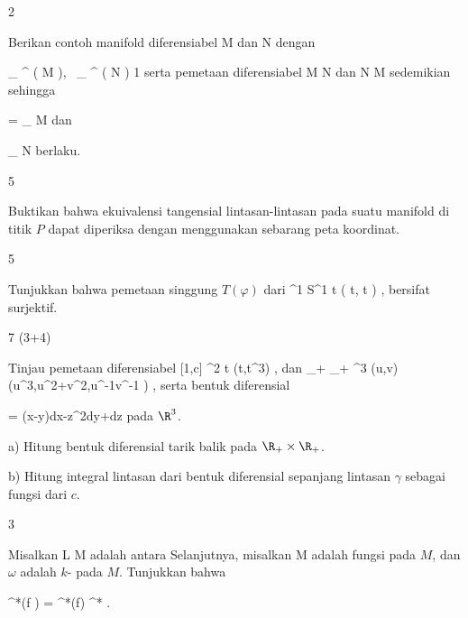 {2}
{

Berikan contoh manifold diferensiabel
\mathkor {} {M} {dan} {N} {}
dengan

\mavergleichskette
{\vergleichskette
{ _{  } ^{  }  \left(   M   \right), \, _{  } ^{  }  \left(   N   \right)
}
{ \geq }{ 1
}
{  }{
}
{    }{
}
{   }{
}
}
{}{}{}
serta pemetaan diferensiabel
\maabb {\varphi} { M } { N
} {}
dan
\maabb {\psi} { N } { M
} {}
sedemikian sehingga

\mavergleichskette
{\vergleichskette
{ \psi \circ \varphi
}
{ = }{
_{ M }
}
{  }{
}
{    }{
}
{   }{
}
}
{}{}{}
dan

\mavergleichskette
{\vergleichskette
{\varphi \circ  \psi
}
{ \neq }{
_{ N }
}
{  }{
}
{    }{
}
{   }{
}
}
{}{}{}
berlaku.

}
{} {}

{5}
{

Buktikan bahwa ekuivalensi tangensial lintasan-lintasan pada suatu manifold di titik $P$ dapat diperiksa dengan menggunakan sebarang peta koordinat.

}
{} {}

{5}
{

Tunjukkan bahwa pemetaan singgung $T(\varphi)$ dari
\maabbeledisp {\varphi} {\R^1} {S^1
} { t } {( \cos  t, \sin  t  )
} {,}
bersifat surjektif.

}
{} {}

{7 (3+4)}
{

Tinjau pemetaan diferensiabel
\maabbeledisp {\gamma} { [1,c] } {\R^2
} { t } {(t,t^{3})
} {,}
 {} {}
dan
\maabbeledisp {\varphi} {\R_+ \times \R_+ } {\R^3
} {(u,v)} {(u^3,u^2+v^2,u^{-1}v^{-1} )
} {,}
serta bentuk diferensial

\mavergleichskettedisp
{\vergleichskette
{ \omega
}
{ =} { (x-y)dx-z^2dy+dz
}
{ } {
}
{ } {
}
{ } {
}
}
{}{}{}
pada $\R^3$.

a) Hitung bentuk diferensial tarik balik
\mathl{\varphi^* \omega}{} pada $\R_+ \times \R_+$.

b) Hitung integral lintasan dari bentuk diferensial
\mathl{\varphi^* \omega}{} sepanjang lintasan $\gamma$ sebagai fungsi dari $c$.

}
{} {}

{3}
{

Misalkan
\maabbdisp {\psi} { L } { M
} {}
adalah
antara
Selanjutnya, misalkan
 { M } {\R
} {}
adalah fungsi pada $M$, dan $\omega$ adalah
$k$-
pada $M$. Tunjukkan bahwa

\mavergleichskettedisp
{\vergleichskette
{ \psi^*(f \omega)
}
{ =} { \psi^*(f)  \psi^* \omega
}
{ } {
}
{ } {
}
{ } {
}
}
{}{}{.}

}
{} {}

